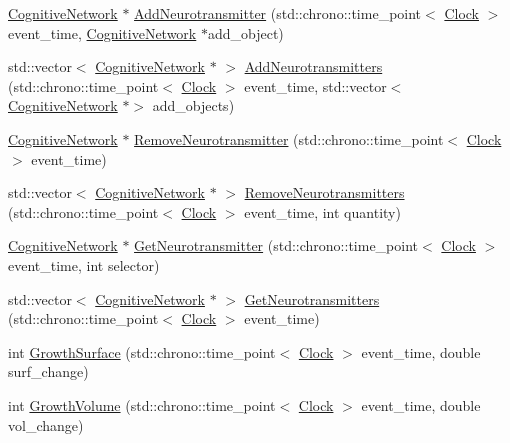 \begin{DoxyCompactItemize}
\item 
\hyperlink{class_cognitive_network}{Cognitive\+Network} $\ast$ \hyperlink{class_synaptic_vesicle_a56d406fdd01f267d868caedb390080ff}{Add\+Neurotransmitter} (std\+::chrono\+::time\+\_\+point$<$ \hyperlink{universe_8h_a0ef8d951d1ca5ab3cfaf7ab4c7a6fd80}{Clock} $>$ event\+\_\+time, \hyperlink{class_cognitive_network}{Cognitive\+Network} $\ast$add\+\_\+object)
\item 
std\+::vector$<$ \hyperlink{class_cognitive_network}{Cognitive\+Network} $\ast$ $>$ \hyperlink{class_synaptic_vesicle_ac924e6b7b824066a89136e52f2d5ce80}{Add\+Neurotransmitters} (std\+::chrono\+::time\+\_\+point$<$ \hyperlink{universe_8h_a0ef8d951d1ca5ab3cfaf7ab4c7a6fd80}{Clock} $>$ event\+\_\+time, std\+::vector$<$ \hyperlink{class_cognitive_network}{Cognitive\+Network} $\ast$$>$ add\+\_\+objects)
\item 
\hyperlink{class_cognitive_network}{Cognitive\+Network} $\ast$ \hyperlink{class_synaptic_vesicle_a7ea7841bd1a7a17c78a023db8860cc22}{Remove\+Neurotransmitter} (std\+::chrono\+::time\+\_\+point$<$ \hyperlink{universe_8h_a0ef8d951d1ca5ab3cfaf7ab4c7a6fd80}{Clock} $>$ event\+\_\+time)
\item 
std\+::vector$<$ \hyperlink{class_cognitive_network}{Cognitive\+Network} $\ast$ $>$ \hyperlink{class_synaptic_vesicle_aab1e61b4910399d56071ca59f2758e72}{Remove\+Neurotransmitters} (std\+::chrono\+::time\+\_\+point$<$ \hyperlink{universe_8h_a0ef8d951d1ca5ab3cfaf7ab4c7a6fd80}{Clock} $>$ event\+\_\+time, int quantity)
\item 
\hyperlink{class_cognitive_network}{Cognitive\+Network} $\ast$ \hyperlink{class_synaptic_vesicle_a3bdf4423899d438b5a1d2246c52c8c45}{Get\+Neurotransmitter} (std\+::chrono\+::time\+\_\+point$<$ \hyperlink{universe_8h_a0ef8d951d1ca5ab3cfaf7ab4c7a6fd80}{Clock} $>$ event\+\_\+time, int selector)
\item 
std\+::vector$<$ \hyperlink{class_cognitive_network}{Cognitive\+Network} $\ast$ $>$ \hyperlink{class_synaptic_vesicle_ada95d85873125115208ff51f60fa72e9}{Get\+Neurotransmitters} (std\+::chrono\+::time\+\_\+point$<$ \hyperlink{universe_8h_a0ef8d951d1ca5ab3cfaf7ab4c7a6fd80}{Clock} $>$ event\+\_\+time)
\item 
int \hyperlink{class_synaptic_vesicle_a045f27b28b8b11edc884568b390c22fe}{Growth\+Surface} (std\+::chrono\+::time\+\_\+point$<$ \hyperlink{universe_8h_a0ef8d951d1ca5ab3cfaf7ab4c7a6fd80}{Clock} $>$ event\+\_\+time, double surf\+\_\+change)
\item 
int \hyperlink{class_synaptic_vesicle_a0d4a4a03405593b3abc0e734c1758830}{Growth\+Volume} (std\+::chrono\+::time\+\_\+point$<$ \hyperlink{universe_8h_a0ef8d951d1ca5ab3cfaf7ab4c7a6fd80}{Clock} $>$ event\+\_\+time, double vol\+\_\+change)
$$
\end{DoxyCompactItemize}
